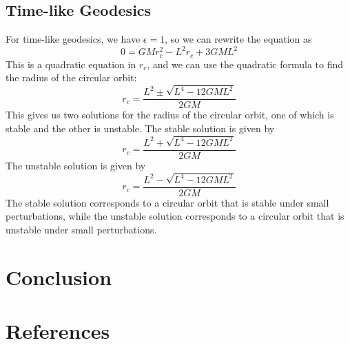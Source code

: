 \documentclass[12pt]{article}
\begin{document}
\subsection{Time-like Geodesics}
For time-like geodesics, we have \(\epsilon = 1\), so we can rewrite the equation as
\[
	0 = GM r_{c}^{2} - L^{2} r_{c} + 3GM L^{2}
\]
This is a quadratic equation in \(r_{c}\), and we can use the quadratic formula to find the radius of the circular orbit:
\[
	r_{c} = \frac{L^{2} \pm \sqrt{L^{4} - 12GM L^{2}}}{2GM}
\]
This gives us two solutions for the radius of the circular orbit, one of which is stable and the other is unstable.
The stable solution is given by
\[
	r_{c} = \frac{L^{2} + \sqrt{L^{4} - 12GM L^{2}}}{2GM}
\]
The unstable solution is given by
\[
	r_{c} = \frac{L^{2} - \sqrt{L^{4} - 12GM L^{2}}}{2GM}
\]
The stable solution corresponds to a circular orbit that is stable under small perturbations, while the unstable solution corresponds to a circular orbit that is unstable under small perturbations.

\section{Conclusion}

\section{References}

\nocite{*}


\end{document}
